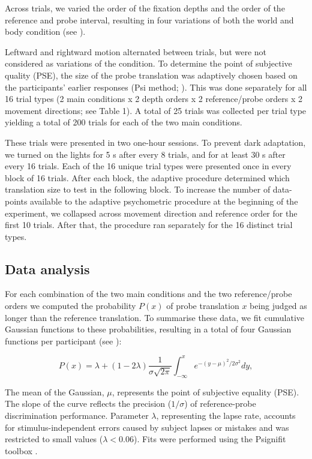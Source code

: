 Across trials, we varied the order of the fixation depths and the order  of the reference and probe interval, resulting in four variations of both the world and body condition (see ).

Leftward and rightward motion alternated between trials, but were not considered as variations of the condition. To determine the point of subjective quality (PSE), the size of the probe translation was adaptively chosen based on the participants' earlier responses (Psi method; ). This was done separately for all 16 trial types (2 main conditions x 2 depth orders x 2 reference/probe orders x 2 movement directions; see Table 1). A total of 25 trials was collected per trial type yielding a total of 200 trials for each of the two main conditions.

These trials were presented in two one-hour sessions. To prevent dark adaptation, we turned on the lights for 5 \si{\second} after every 8 trials, and for at least 30 s after every 16 trials. Each of the 16 unique trial types were presented once in every block of 16 trials. After each block, the adaptive procedure determined which translation size to test in the following block. To increase the number of data-points available to the adaptive psychometric procedure at the beginning of the experiment, we collapsed across movement direction and reference order for the first 10 trials. After that, the procedure ran separately for the 16 distinct trial types.

\subsection{Data analysis}

For each combination of the two main conditions and the two reference/probe orders we computed the probability $P(x)$ of probe translation $x$ being  judged as longer than the reference translation. To summarise these data, we fit cumulative Gaussian functions to these probabilities, resulting in a total of four Gaussian functions per participant (see ):

\begin{equation}
\label{p4:eq1}
P(x) = \lambda + (1 - 2\lambda) \frac{1}{\sigma \sqrt{2\pi}} \int_{-\infty}^{x}{e^{-(y-\mu)^2 / 2\sigma^2}}dy,
\end{equation}

The mean of the Gaussian, $\mu$, represents the point of subjective equality (PSE). The slope of the curve reflects the precision ($1/\sigma$) of reference-probe discrimination performance. Parameter $\lambda$, representing the lapse rate, accounts for stimulus-independent errors caused by subject lapses or mistakes and was restricted to small values ($\lambda < 0.06$). Fits were performed using the Psignifit toolbox \cite{wichmann2001,wichmann2001b}.

